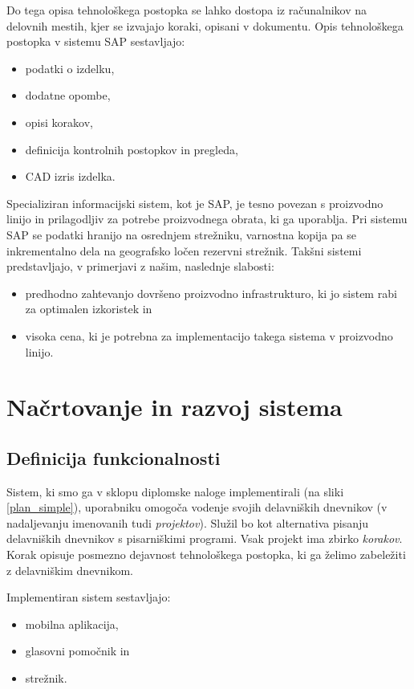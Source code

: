 \documentclass[a4paper, 12pt]{book}
\begin{document}
Do tega opisa tehnološkega postopka se lahko dostopa iz računalnikov na delovnih mestih, kjer se izvajajo koraki, opisani v dokumentu.
Opis tehnološkega postopka v sistemu SAP sestavljajo:
\begin{itemize}
	\item podatki o izdelku,
	\item dodatne opombe,
	\item opisi korakov,
	\item definicija kontrolnih postopkov in pregleda, 
	\item CAD izris izdelka.
\end{itemize}

Specializiran informacijski sistem, kot je SAP, je tesno povezan s proizvodno linijo in prilagodljiv za potrebe proizvodnega obrata, ki ga uporablja.
Pri sistemu SAP se podatki hranijo na osrednjem strežniku, varnostna kopija pa se inkrementalno dela na geografsko ločen rezervni strežnik.
Takšni sistemi predstavljajo, v primerjavi z našim, naslednje slabosti:
\begin{itemize}
	\item predhodno zahtevanjo dovršeno proizvodno infrastrukturo, ki jo sistem rabi za optimalen izkoristek in
	\item visoka cena, ki je potrebna za implementacijo takega sistema v proizvodno linijo.
\end{itemize}

\clearpage

\chapter{Načrtovanje in razvoj sistema}

\section{Definicija funkcionalnosti} \label{architecture}

Sistem, ki smo ga v sklopu diplomske naloge implementirali (na sliki \ref{plan_simple}), uporabniku omogoča vodenje svojih delavniških dnevnikov (v nadaljevanju imenovanih tudi \textit{projektov}).
Služil bo kot alternativa pisanju delavniških dnevnikov s pisarniškimi programi.
Vsak projekt ima zbirko \textit{korakov}.
Korak opisuje posmezno dejavnost tehnološkega postopka, ki ga želimo zabeležiti z delavniškim dnevnikom.

Implementiran sistem sestavljajo:
\begin{itemize}
	\item mobilna aplikacija,
	\item glasovni pomočnik in
	\item strežnik.
\end{itemize}
\end{document}
